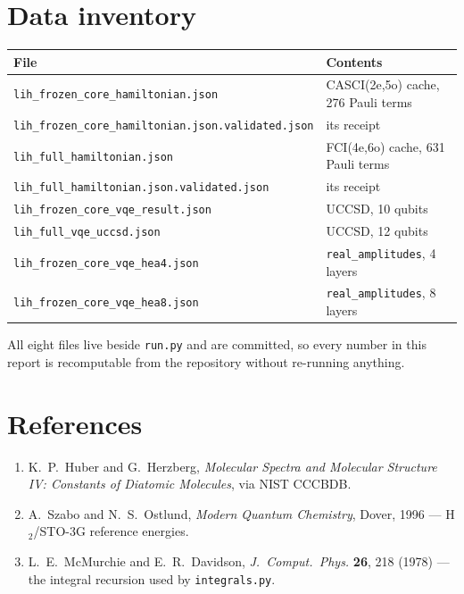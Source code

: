 \documentclass[11pt,a4paper]{article}
\newcommand{\code}[1]{\texttt{\small #1}}
\begin{document}
\section{Data inventory}

\begin{center}
\small
\begin{tabular}{ll}
\toprule
File & Contents \\
\midrule
\code{lih\_frozen\_core\_hamiltonian.json}       & CASCI(2e,5o) cache, 276 Pauli terms \\
\code{lih\_frozen\_core\_hamiltonian.json.validated.json} & its receipt \\
\code{lih\_full\_hamiltonian.json}               & FCI(4e,6o) cache, 631 Pauli terms \\
\code{lih\_full\_hamiltonian.json.validated.json} & its receipt \\
\code{lih\_frozen\_core\_vqe\_result.json}       & UCCSD, 10 qubits \\
\code{lih\_full\_vqe\_uccsd.json}                & UCCSD, 12 qubits \\
\code{lih\_frozen\_core\_vqe\_hea4.json}         & \code{real\_amplitudes}, 4 layers \\
\code{lih\_frozen\_core\_vqe\_hea8.json}         & \code{real\_amplitudes}, 8 layers \\
\bottomrule
\end{tabular}
\end{center}

All eight files live beside \code{run.py} and are committed, so every number in
this report is recomputable from the repository without re-running anything.

\section*{References}
\small
\begin{enumerate}[leftmargin=1.4em,itemsep=0.1em]
\item K.\ P.\ Huber and G.\ Herzberg, \emph{Molecular Spectra and Molecular
  Structure IV: Constants of Diatomic Molecules}, via NIST CCCBDB.
\item A.\ Szabo and N.\ S.\ Ostlund, \emph{Modern Quantum Chemistry}, Dover,
  1996 --- H$_2$/STO-3G reference energies.
\item L.\ E.\ McMurchie and E.\ R.\ Davidson, \emph{J.\ Comput.\ Phys.}
  \textbf{26}, 218 (1978) --- the integral recursion used by
  \code{integrals.py}.
\end{enumerate}
\end{document}
